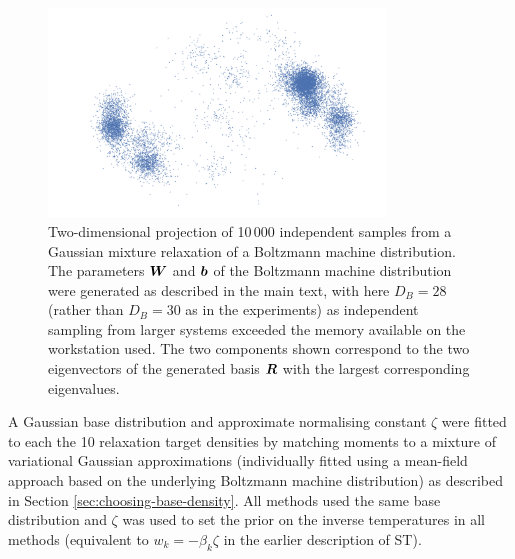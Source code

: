 \begin{figure}
\centering
\includegraphics[width=0.8\textwidth]{images/continuous-tempering/boltzmann-machine-relaxation-samples-cropped}
\caption[Boltzmann machine relaxation samples.]{Two-dimensional projection of 10\,000 independent samples from a Gaussian mixture relaxation of a Boltzmann machine distribution. The parameters $\boldsymbol{W}$ and $\boldsymbol{b}$ of the Boltzmann machine distribution were generated as described in the main text, with here $D_B = 28$ (rather than $D_B = 30$ as in the experiments) as independent sampling from larger systems exceeded the memory available on the workstation used. The two components shown correspond to the two eigenvectors of the generated basis $\boldsymbol{R}$ with the largest corresponding eigenvalues.}
\label{fig:bmr-samples-2d}
\end{figure}

A Gaussian base distribution and approximate normalising constant $\zeta$ were fitted to each the 10 relaxation target densities by matching moments to a mixture of variational Gaussian approximations (individually fitted using a mean-field approach based on the underlying Boltzmann machine distribution) as described in Section \ref{sec:choosing-base-density}. All methods used the same base distribution and $\zeta$ was used to set the prior on the inverse temperatures in all methods (equivalent to $w_k = -\beta_k\zeta$ in the earlier description of \ac{ST}).

